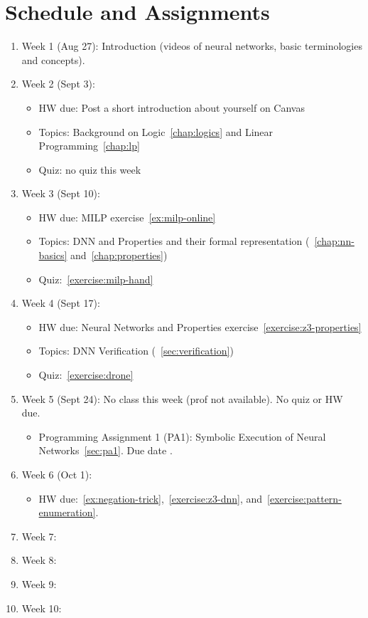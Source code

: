 \documentclass[oneside,11pt,dvipsnames]{book}
\numberwithin{equation}{section}
\theoremstyle{definition}
\theoremstyle{remark}
\newcommand{\alert}[1]{{\color{red}{#1}}}
\begin{document}
\chapter{Schedule and Assignments}
\begin{enumerate}
    \item Week 1 (Aug 27): Introduction (videos of neural networks, basic terminologies and concepts).
    \item Week 2 (Sept 3):
    \begin{itemize}
    \item HW due: Post a short introduction about yourself on Canvas
    \item Topics: Background on Logic~\autoref{chap:logics} and Linear Programming~\autoref{chap:lp}
    \item Quiz: no quiz this week
    \end{itemize}
    \item Week 3 (Sept 10):
    \begin{itemize}
        \item HW due: MILP exercise~\autoref{ex:milp-online}
        \item Topics: DNN and Properties and their formal representation (~\autoref{chap:nn-basics} and~\autoref{chap:properties})
        \item Quiz:~\autoref{exercise:milp-hand}
    \end{itemize}
    \item Week 4 (Sept 17):
    \begin{itemize}
        \item HW due: Neural Networks and Properties exercise~\autoref{exercise:z3-properties}
        \item Topics: DNN Verification (~\autoref{sec:verification}) 
        \item Quiz:~\autoref{exercise:drone}
    \end{itemize}
    \item Week 5 (Sept 24): No class this week (prof not available). No quiz or HW due. 
    \begin{itemize}
        \item Programming Assignment 1 (PA1): Symbolic Execution of Neural Networks~\autoref{sec:pa1}. Due date \alert{Monday October 6, 2024 11:59pm}.
    \end{itemize}
    \item Week 6 (Oct 1):
    \begin{itemize}
        \item HW due:~\autoref{ex:negation-trick},~\autoref{exercise:z3-dnn}, and~\autoref{exercise:pattern-enumeration}. %
    \end{itemize}
    \item Week 7:
    \item Week 8:
    \item Week 9:
    \item Week 10:
\end{enumerate}    
\end{document}
